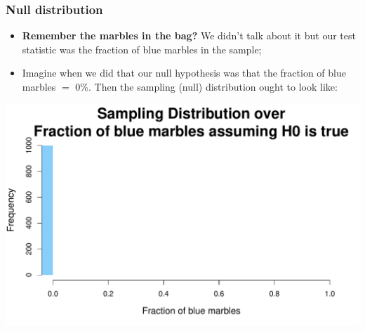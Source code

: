 \documentclass[aspectratio=169]{beamer}
\theoremstyle{principle}
\begin{document}
\begin{frame}
\frametitle{Null distribution}
  
\begin{itemize}
\item \textbf{Remember the marbles in the bag?}  We didn't talk about it but our test statistic was the fraction of blue marbles in the sample;
\bigskip

\item Imagine when we did that our null hypothesis was that the fraction of blue marbles $=$ 0\%.  Then the sampling (null) distribution ought to look like:
\end{itemize}

\begin{center}
\includegraphics[scale=0.4]{null_0.pdf}
\end{center}

\end{frame}
\end{document}

